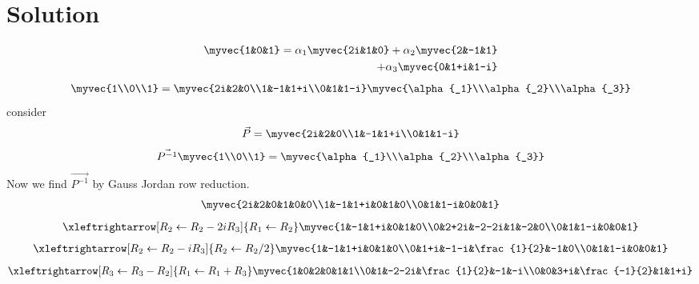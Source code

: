 \documentclass[journal,12pt,twocolumn]{IEEEtran}
\begin{document}
\section{Solution}
\begin{multline}
\begin{aligned}
 \myvec{1&0&1}=\alpha{_1}\myvec{2i&1&0}+\alpha{_2}\myvec{2&-1&1}\\+\alpha{_3}
 \myvec{0&1+i&1-i}
\end{aligned}
\end{multline}
\begin{align}
  \myvec{1\\0\\1}=\myvec{2i&2&0\\1&-1&1+i\\0&1&1-i}\myvec{\alpha{_1}\\\alpha{_2}\\\alpha{_3}}
\end{align}
consider
\begin{align}
  \vec{P}=\myvec{2i&2&0\\1&-1&1+i\\0&1&1-i}
\end{align}
\begin{align}
 \vec{P^{-1}}\myvec{1\\0\\1}=\myvec{\alpha{_1}\\\alpha{_2}\\\alpha{_3}}
 \end{align}
 Now we find $\vec{P^{-1}}$ by Gauss Jordan row reduction.
\begin{align}
    \myvec{2i&2&0&1&0&0\\1&-1&1+i&0&1&0\\0&1&1-i&0&0&1}
\end{align}
\begin{align}
    \xleftrightarrow[R_2\leftarrow R_2-2iR_3]{R_1\leftarrow R_2}\myvec{1&-1&1+i&0&1&0\\0&2+2i&-2-2i&1&-2&0\\0&1&1-i&0&0&1}
\end{align}
\begin{align}
    \xleftrightarrow[R_2\leftarrow R_2-iR_3]{R_2\leftarrow R_2/2}\myvec{1&-1&1+i&0&1&0\\0&1+i&-1-i&\frac{1}{2}&-1&0\\0&1&1-i&0&0&1}
\end{align}
\begin{align}
\xleftrightarrow[R_3\leftarrow R_3-R_2]{R_1\leftarrow R_1+R_3}\myvec{1&0&2&0&1&1\\0&1&-2-2i&\frac{1}{2}&-1&-i\\0&0&3+i&\frac{-1}{2}&1&1+i}
\end{align}
\end{document}
